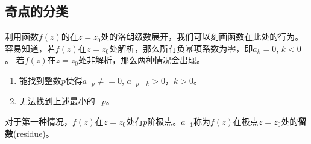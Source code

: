 \subsection{奇点的分类}
\label{subsec:singular_points}
利用函数$f(z)$的在$z=z_0$处的洛朗级数展开，我们可以刻画函数在此处的行为。
容易知道，若$f(z)$在$z=z_0$处解析，那么所有负幂项系数为零，即$a_k = 0$, $k<0$。
若$f(z)$在$z=z_0$处非解析，那么两种情况会出现。
\begin{enumerate}
    \item 能找到整数$p$使得$a_{-p} \neq =0$, $a_{-p - k}>0$，$k>0$。
    \item 无法找到上述最小的$-p$。
\end{enumerate}
对于第一种情况，$f(z)$在$z=z_0$处有$p$阶极点。$a_{-1}$称为$f(z)$在极点$z=z_0$处的\textbf{留数}(residue)。